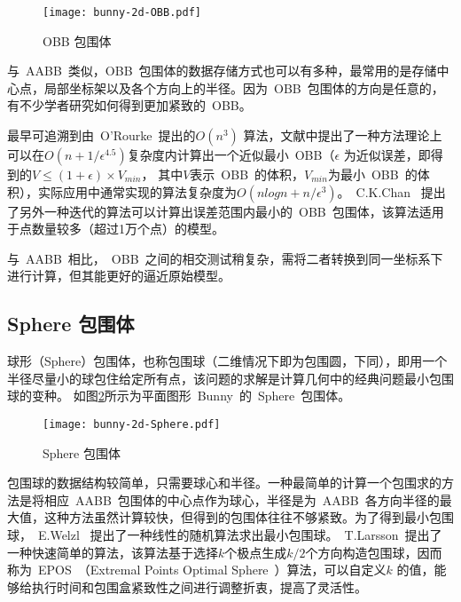 \begin{figure}[H] %
  \centering
  \texttt{[image: bunny-2d-OBB.pdf]}
  \caption{OBB 包围体}
  \label{fig:obb-bunny}
\end{figure}

与~AABB~类似，OBB~包围体的数据存储方式也可以有多种，最常用的是存储中心点，局部坐标架以及各个方向上的半径\cite{gottschalk1996obbtree}。因为~OBB~包围体的方向是任意的，有不少学者研究如何得到更加紧致的~OBB。

最早可追溯到由~O'Rourke~\cite{o1985finding}提出的$O(n^3)$
算法，文献中提出了一种方法理论上可以在$O(n
+ 1/ \epsilon ^{4.5} )$复杂度内计算出一个近似最小~OBB（$\epsilon$
为近似误差，即得到的$V\leq(1+\epsilon)\times V_{min}$，
其中$V$表示~OBB~的体积，$V_{min}$为最小~OBB~的体积），实际应用中通常实现的算法复杂度为$O(nlogn + n/
\epsilon ^{3} )$。~C.K.Chan~ \cite{chan2001determination}
提出了另外一种迭代的算法可以计算出误差范围内最小的~OBB~包围体，该算法适用于点数量较多（超过1万个点）的模型。

与~AABB~相比，~OBB~之间的相交测试稍复杂，需将二者转换到同一坐标系下进行计算，但其能更好的逼近原始模型。

\subsection{Sphere 包围体}

球形（Sphere）包围体，也称包围球（二维情况下即为包围圆，下同），即用一个半径尽量小的球包住给定所有点，该问题的求解是计算几何中的经典问题最小包围球的变种。
如图\ref{fig:sphere-bunny}所示为平面图形~Bunny~的~Sphere~包围体。

\begin{figure}[H] %
  \centering
  \texttt{[image: bunny-2d-Sphere.pdf]}
  \caption{Sphere 包围体}
  \label{fig:sphere-bunny}
\end{figure}

包围球的数据结构较简单，只需要球心和半径。一种最简单的计算一个包围求的方法是将相应~AABB~包围体的中心点作为球心，半径是为~AABB~各方向半径的最大值，这种方法虽然计算较快，但得到的包围体往往不够紧致。为了得到最小包围球，~E.Welzl~\cite{Welzl1991Smallest}
提出了一种线性的随机算法求出最小包围球。~T.Larsson~\cite{larsson2008fast}提出了一种快速简单的算法，该算法基于选择$k$个极点生成$k/2$个方向构造包围球，因而称为~EPOS~（Extremal Points Optimal Sphere~）算法，可以自定义$k$ 的值，能够给执行时间和包围盒紧致性之间进行调整折衷，提高了灵活性。

